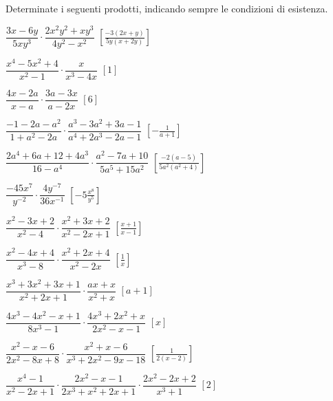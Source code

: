 \begin{esercizio}[\Ast]
\label{ese:19.13}
Determinate i seguenti prodotti, indicando sempre le condizioni di esistenza.
\begin{enumeratea}
 \item \(\dfrac{3x-6y}{5xy^{3}}\cdot\dfrac{2x^{2}y^{2}+xy^{3}}{4y^{2}-x^{2}}\)
 \hfill \(\left[\frac{-{3(2x+y)}}{5y(x+2y)}\right]\)
 \item \(\dfrac{x^{4}-5x^{2}+4}{x^{2}-1}\cdot\dfrac{x}{x^{3}-4x}\)
 \hfill \(\left[1\right]\)
 \item \(\dfrac{4x-2a}{x-a}\cdot\dfrac{3a-3x}{a-2x}\)
 \hfill \(\left[6\right]\)
 \item \(\dfrac{-1-2a-a^{2}}{1+a^{2}-2a}\cdot
        \dfrac{a^{3}-3a^{2}+3a-1}{a^{4}+2a^{3}-2a-1}\)
 \hfill \(\left[-{\frac{1}{a+1}}\right]\)
 \item \(\dfrac{2a^{4}+6a+12+4a^{3}}{16-a^{4}}\cdot
        \dfrac{a^{2}-7a+10}{5a^{5}+15a^{2}}\)
 \hfill \(\left[\frac{-{2(a-5)}}{5a^{2}(a^{2}+4)}\right]\)
 \item \(\dfrac{-45x^{7}}{y^{-2}}\cdot\dfrac{4y^{-7}}{36x^{-1}}\)
 \hfill \(\left[-5\frac{x^{8}}{y^{5}}\right]\)
 \item \(\dfrac{x^{2}-3x+2}{x^{2}-4}\cdot\dfrac{x^{2}+3x+2}{x^{2}-2x+1}\)
 \hfill \(\left[\frac{x+1}{x-1}\right]\)
 \item \(\dfrac{x^{2}-4x+4}{x^{3}-8}\cdot\dfrac{x^{2}+2x+4}{x^{2}-2x}\)
 \hfill \(\left[\frac{1}{x}\right]\)
 \item \(\dfrac{x^{3}+3x^{2}+3x+1}{x^{2}+2x+1}\cdot \dfrac{ax+x}{x^{2}+x}\)
 \hfill \(\left[a+1\right]\)
 \item \(\dfrac{4x^{3}-4x^{2}-x+1}{8x^{3}-1}\cdot
        \dfrac{4x^{3}+2x^{2}+x}{2x^{2}-x-1}\)
 \hfill \(\left[x\right]\)
 \item \(\dfrac{x^{2}-x-6}{2x^{2}-8x+8}\cdot
        \dfrac{x^{2}+x-6}{x^{3}+2x^{2}-9x-18}\)
 \hfill \(\left[\frac{1}{2(x-2)}\right]\)
 \item \(\dfrac{x^{4}-1}{x^{2}-2x+1}\cdot
        \dfrac{2x^{2}-x-1}{2x^{3}+x^{2}+2x+1}\cdot
        \dfrac{2x^{2}-2x+2}{x^{3}+1}\)
 \hfill \(\left[2\right]\)
\end{enumeratea}
\end{esercizio}

\newpage %

